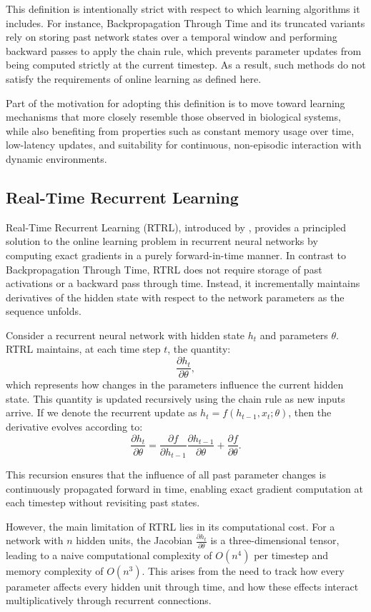 This definition is intentionally strict with respect to which learning algorithms it includes. For instance, Backpropagation Through Time and its truncated variants rely on storing past network states over a temporal window and performing backward passes to apply the chain rule, which prevents parameter updates from being computed strictly at the current timestep. As a result, such methods do not satisfy the requirements of online learning as defined here.

Part of the motivation for adopting this definition is to move toward learning mechanisms that more closely resemble those observed in biological systems, while also benefiting from properties such as constant memory usage over time, low-latency updates, and suitability for continuous, non-episodic interaction with dynamic environments. 

\subsection{Real-Time Recurrent Learning}

Real-Time Recurrent Learning (RTRL), introduced by \citet{RTRL}, provides a principled solution to the online learning problem in recurrent neural networks by computing exact gradients in a purely forward-in-time manner. In contrast to Backpropagation Through Time, RTRL does not require storage of past activations or a backward pass through time. Instead, it incrementally maintains derivatives of the hidden state with respect to the network parameters as the sequence unfolds.

Consider a recurrent neural network with hidden state $h_t$ and parameters $\theta$. RTRL maintains, at each time step $t$, the quantity:
\[
\frac{\partial h_t}{\partial \theta},
\]
which represents how changes in the parameters influence the current hidden state. This quantity is updated recursively using the chain rule as new inputs arrive. If we denote the recurrent update as $h_t = f(h_{t-1}, x_t; \theta)$, then the derivative evolves according to:
\[
\frac{\partial h_t}{\partial \theta}
=
\frac{\partial f}{\partial h_{t-1}} \frac{\partial h_{t-1}}{\partial \theta}
+
\frac{\partial f}{\partial \theta}.
\]

This recursion ensures that the influence of all past parameter changes is continuously propagated forward in time, enabling exact gradient computation at each timestep without revisiting past states.

However, the main limitation of RTRL lies in its computational cost. For a network with $n$ hidden units, the Jacobian $\frac{\partial h_t}{\partial \theta}$ is a three-dimensional tensor, leading to a naive computational complexity of $O(n^4)$ per timestep and memory complexity of $O(n^3)$. This arises from the need to track how every parameter affects every hidden unit through time, and how these effects interact multiplicatively through recurrent connections.

